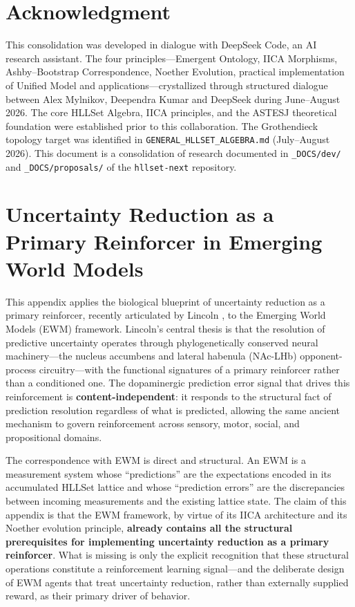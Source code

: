 \documentclass[11pt,a4paper]{article}
\theoremstyle{remark}
\begin{document}
\section*{Acknowledgment}
This consolidation was developed in dialogue with DeepSeek Code, an AI research
assistant. The four principles---Emergent Ontology, IICA Morphisms, Ashby--Bootstrap
Correspondence, Noether Evolution, practical implementation of Unified Model and applications---crystallized through structured dialogue between
Alex Mylnikov, Deependra Kumar and DeepSeek during June--August 2026. The core HLLSet Algebra, IICA
principles, and the ASTESJ theoretical foundation were established prior to this
collaboration. The Grothendieck topology target was identified in
\texttt{GENERAL\_HLLSET\_ALGEBRA.md} (July--August 2026). This document is a
consolidation of research documented in \texttt{\_DOCS/dev/} and
\texttt{\_DOCS/proposals/} of the \texttt{hllset-next} repository.

\appendix
\section{Uncertainty Reduction as a Primary Reinforcer in Emerging World Models}
\label{sec:appendix-reinforcement}

This appendix applies the biological blueprint of uncertainty reduction as a
primary reinforcer, recently articulated by Lincoln \cite{lincoln2026}, to the
Emerging World Models (EWM) framework. Lincoln's central thesis is that the
resolution of predictive uncertainty operates through phylogenetically conserved
neural machinery---the nucleus accumbens and lateral habenula (NAc-LHb)
opponent-process circuitry---with the functional signatures of a primary
reinforcer rather than a conditioned one. The dopaminergic prediction error
signal that drives this reinforcement is \textbf{content-independent}: it
responds to the structural fact of prediction resolution regardless of what is
predicted, allowing the same ancient mechanism to govern reinforcement across
sensory, motor, social, and propositional domains.

The correspondence with EWM is direct and structural. An EWM is a measurement
system whose ``predictions'' are the expectations encoded in its accumulated
HLLSet lattice and whose ``prediction errors'' are the discrepancies between
incoming measurements and the existing lattice state. The claim of this appendix
is that the EWM framework, by virtue of its IICA architecture and its Noether
evolution principle, \textbf{already contains all the structural prerequisites
for implementing uncertainty reduction as a primary reinforcer}. What is
missing is only the explicit recognition that these structural operations
constitute a reinforcement learning signal---and the deliberate design of EWM
agents that treat uncertainty reduction, rather than externally supplied reward,
as their primary driver of behavior.
\end{document}
